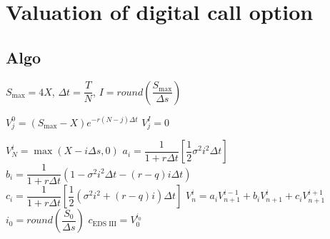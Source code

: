 \section{Valuation of digital call option}

\subsection{Algo}

\begin{algorithm}[H]
	$S_{\max} = 4X$, 
	$\Delta t = \dfrac{T}{N}$, 
	$I = round \left ( \dfrac{S_{\max}}{\Delta s} \right)$\;
	
	 {
		$V^{0}_{j} = (S_{\max} - X)e^{-r(N-j) \Delta t}$\;
		$V^{I}_{j} = 0$\;
	}
	
	 {
		$V^{i}_{N} = \max(X - i\Delta s, 0)$\;
		$a_i = \dfrac{1}{1 + r \Delta t} \left [\dfrac{1}{2} \sigma^2 i^2 \Delta t \right ]$\;
		$b_i = \dfrac{1}{1 + r \Delta t} \left (1 - \sigma^2 i^2 \Delta t - (r-q) i \Delta t \right )$\;
		$c_i = \dfrac{1}{1 + r \Delta t} \left [ \dfrac{1}{2} ( \sigma^2 i^2 + (r-q)i) \Delta t \right ]$\;
		 {
			$V_n^i = a_i V^{i - 1}_{n+1} + b_i V^i_{n+1} + c_i V^{i+1}_{n+1}$ \;
		}
	}
	$i_0 = round \left (\dfrac{S_0}{\Delta s} \right )$\;
	$c_{\text{EDS III}} = V_0^{i_0}$\;
	
\end{algorithm}



